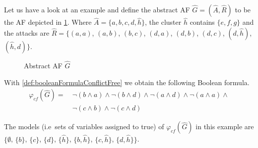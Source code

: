 \begin{example}
    Let us have a look at an example and define the abstract AF $\hat{G} = (\hat{A}, \hat{R})$ to be the AF depicted in \cref{af:algorithmEncodingsConflictFree}. Where $\hat{A}=\{a, b, c, d, \hat{h}\}$, the cluster $\hat{h}$ contains $\{e, f, g\}$ and the attacks are $\hat{R}=\big\{ (a,a)$, $(a,b)$, $(b,c)$, $(d,a)$, $(d,b)$, $(d,c)$, $(d, \hat{h})$, $(\hat{h}, d)\big\}$.

    \begin{figure}[H]
        \centering
        \caption{Abstract AF $\hat{G}$}
        \label{af:algorithmEncodingsConflictFree}
    \end{figure}

With \cref{def:booleanFormulaConflictFree} we obtain the following Boolean formula.
\begin{align*}
    \varphi_{cf}(\hat{G}) =\ &
    \lnot(b \land a)  \land
    \lnot(b \land d)  \land
    \lnot(a \land d)  \land
    \lnot(a \land a)  \land
    \\
    & \lnot(c \land b)  \land
    \lnot(c \land d)
\end{align*}

The models (i.e\ sets of variables assigned to true) of $\varphi_{cf}(\hat{G})$ in this example are $\bigl\{\emptyset$, $\{b\}$, $\{c\}$, $\{d\}$, $\{\hat{h}\}$, $\{b, \hat{h}\}$, $\{c, \hat{h}\}$, $\{d, \hat{h}\}\bigl\}$.
\end{example}

